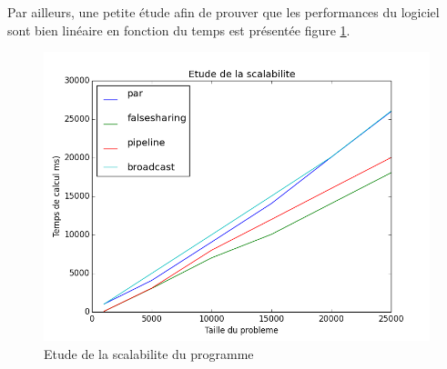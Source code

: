 Par ailleurs, une petite étude afin de prouver que les performances du logiciel sont bien linéaire en fonction du temps est présentée figure \ref{img:inclusifs}. \\

\begin{figure}[H]
\begin{center}
   \includegraphics[scale=0.35]{images/scalability.png}
   \caption{\label{img:inclusifs} Etude de la scalabilite du programme}
\end{center}
\end{figure}
